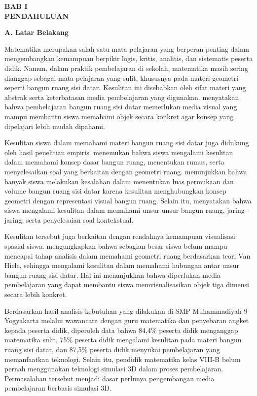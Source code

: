 \begin{center}
    \textbf{BAB I}\\
    \textbf{PENDAHULUAN}
\end{center}

\textbf{A. Latar Belakang}

\hspace*{1cm}Matematika merupakan salah satu mata pelajaran yang berperan penting dalam mengembangkan kemampuan berpikir logis, kritis, analitis, dan sistematis peserta didik. Namun, dalam praktik pembelajaran di sekolah, matematika masih sering dianggap sebagai mata pelajaran yang sulit, khususnya pada materi geometri seperti bangun ruang sisi datar. Kesulitan ini disebabkan oleh sifat materi yang abstrak serta keterbatasan media pembelajaran yang digunakan. \citet{safira2021} menyatakan bahwa pembelajaran bangun ruang sisi datar memerlukan media visual yang mampu membantu siswa memahami objek secara konkret agar konsep yang dipelajari lebih mudah dipahami.

\hspace*{1cm}Kesulitan siswa dalam memahami materi bangun ruang sisi datar juga didukung oleh hasil penelitian empiris. \citet{chintia2021} menemukan bahwa siswa mengalami kesulitan dalam memahami konsep dasar bangun ruang, menentukan rumus, serta menyelesaikan soal yang berkaitan dengan geometri ruang. \citet{putra2022} menunjukkan bahwa banyak siswa melakukan kesalahan dalam menentukan luas permukaan dan volume bangun ruang sisi datar karena kesulitan menghubungkan konsep geometri dengan representasi visual bangun ruang. Selain itu, \citet{syafiah2022} menyatakan bahwa siswa mengalami kesulitan dalam memahami unsur-unsur bangun ruang, jaring-jaring, serta penyelesaian soal kontekstual.

\hspace*{1cm}Kesulitan tersebut juga berkaitan dengan rendahnya kemampuan visualisasi spasial siswa. \citet{sahara2021} mengungkapkan bahwa sebagian besar siswa belum mampu mencapai tahap analisis dalam memahami geometri ruang berdasarkan teori Van Hiele, sehingga mengalami kesulitan dalam memahami hubungan antar unsur bangun ruang sisi datar. Hal ini menunjukkan bahwa diperlukan media pembelajaran yang dapat membantu siswa memvisualisasikan objek tiga dimensi secara lebih konkret.

\hspace*{1cm}Berdasarkan hasil analisis kebutuhan yang dilakukan di SMP Muhammadiyah 9 Yogyakarta melalui wawancara dengan guru matematika dan penyebaran angket kepada peserta didik, diperoleh data bahwa 84,4\% peserta didik menganggap matematika sulit, 75\% peserta didik mengalami kesulitan pada materi bangun ruang sisi datar, dan 87,5\% peserta didik menyukai pembelajaran yang memanfaatkan teknologi. Selain itu, pendidik matematika kelas VIII-B belum pernah menggunakan teknologi simulasi 3D dalam proses pembelajaran. Permasalahan tersebut menjadi dasar perlunya pengembangan media pembelajaran berbasis simulasi 3D.

